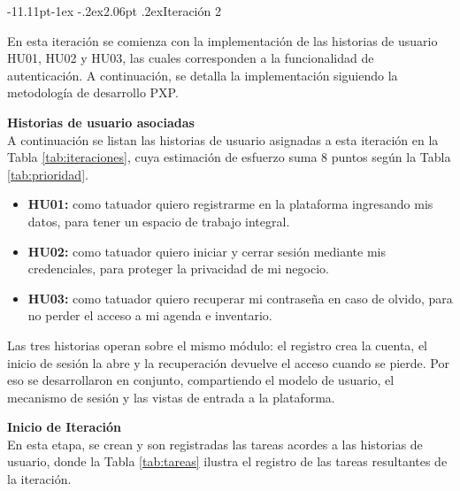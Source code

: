 \documentclass[12pt,letterpaper,oneside]{report}
\makeatletter
\renewcommand\subsection{\@startsection{subsection}{2}{\z@}%
  {-11.11pt\@plus -1ex \@minus -.2ex}{2.06pt \@plus .2ex}{\normalfont\normalsize\bfseries}}
\newcommand{\tituloparpegado}[1]{\par\textbf{#1}\\\indent\ignorespaces}
\makeatother
\begin{document}
\subsection{Iteración 2}

En esta iteración se comienza con la implementación de las historias de usuario HU01, HU02 y HU03, las cuales corresponden a la funcionalidad de autenticación. A continuación, se detalla la implementación siguiendo la metodología de desarrollo PXP.

\vspace{0.3cm}
\tituloparpegado{Historias de usuario asociadas}
A continuación se listan las historias de usuario asignadas a esta iteración en la Tabla \ref{tab:iteraciones}, cuya estimación de esfuerzo suma 8 puntos según la Tabla \ref{tab:prioridad}.

\begin{itemize}
  \item \textbf{HU01:} como tatuador quiero registrarme en la plataforma ingresando mis datos, para tener un espacio de trabajo integral.
  \item \textbf{HU02:} como tatuador quiero iniciar y cerrar sesión mediante mis credenciales, para proteger la privacidad de mi negocio.
  \item \textbf{HU03:} como tatuador quiero recuperar mi contraseña en caso de olvido, para no perder el acceso a mi agenda e inventario.
\end{itemize}

Las tres historias operan sobre el mismo módulo: el registro crea la cuenta, el inicio de sesión la abre y la recuperación devuelve el acceso cuando se pierde. Por eso se desarrollaron en conjunto, compartiendo el modelo de usuario, el mecanismo de sesión y las vistas de entrada a la plataforma.

\vspace{0.3cm}
\tituloparpegado{Inicio de Iteración}
En esta etapa, se crean y son registradas las tareas acordes a las historias de usuario, donde la Tabla \ref{tab:tareas} ilustra el registro de las tareas resultantes de la iteración.
\end{document}
